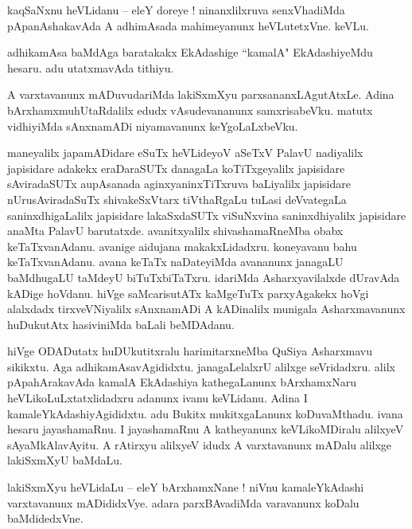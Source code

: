 \documentclass{article}
\begin{document}
\begin{mn}%
kaqSaNxnu heVLidanu -- eleY doreye ! ninanxlilxruva senxVhadiMda pApanAshakavAda A adhimAsada 
mahimeyanunx heVLutetxVne. keVLu.
\end{mn}

\begin{mn}%
adhikamAsa baMdAga baratakakx EkAdashige ``kamalA" EkAdashiyeMdu hesaru. adu utatxmavAda tithiyu.
\end{mn}

\begin{mn}%
A varxtavanunx mADuvudariMda lakiSxmXyu parxsananxLAgutAtxLe. Adina bArxhamxmuhUtaRdalilx  edudx 
vAsudevananunx samxrisabeVku. matutx vidhiyiMda sAnxnamADi niyamavanunx keYgoLaLxbeVku.
\end{mn}

\begin{mn}%
maneyalilx japamADidare eSuTx heVLideyoV aSeTxV PalavU nadiyalilx japisidare adakekx eraDaraSUTx 
danagaLa koTiTxgeyalilx japisidare sAviradaSUTx aupAsanada aginxyaninxTiTxruva baLiyalilx 
japisidare nUrusAviradaSuTx shivakeSxVtarx tiVthaRgaLu tuLasi deVvategaLa saninxdhigaLalilx 
japisidare lakaSxdaSUTx viSuNxvina saninxdhiyalilx japisidare anaMta PalavU barutatxde. 
avanitxyalilx shivashamaRneMba obabx keTaTxvanAdanu. avanige aidujana makakxLidadxru. koneyavanu 
bahu keTaTxvanAdanu. avana keTaTx naDateyiMda avananunx janagaLU baMdhugaLU taMdeyU 
biTuTxbiTaTxru. idariMda Asharxyavilalxde dUravAda kADige hoVdanu. hiVge saMcarisutATx kaMgeTuTx 
parxyAgakekx hoVgi alalxdadx tirxveVNiyalilx sAnxnamADi A kADinalilx munigala Asharxmavanunx 
huDukutAtx hasiviniMda baLali beMDAdanu.
\end{mn}

\begin{mn}%
hiVge ODADutatx huDUkutitxralu harimitarxneMba QuSiya Asharxmavu sikikxtu. Aga 
adhikamAsavAgididxtu. janagaLelalxrU alilxge seVridadxru. alilx pApahArakavAda kamalA EkAdashiya 
kathegaLanunx bArxhamxNaru heVLikoLuLxtatxlidadxru adanunx ivanu keVLidanu. Adina I 
kamaleYkAdashiyAgididxtu.  adu Bukitx mukitxgaLanunx koDuvaMthadu. ivana hesaru jayashamaRnu. I 
jayashamaRnu A katheyanunx keVLikoMDiralu alilxyeV sAyaMkAlavAyitu. A rAtirxyu alilxyeV idudx A 
varxtavanunx mADalu alilxge lakiSxmXyU baMdaLu.
\end{mn}

\begin{mn}%
lakiSxmXyu heVLidaLu -- eleY bArxhamxNane ! niVnu kamaleYkAdashi varxtavanunx mADididxVye. adara 
parxBAvadiMda varavanunx koDalu baMdidedxVne.
\end{mn}
\end{document}

